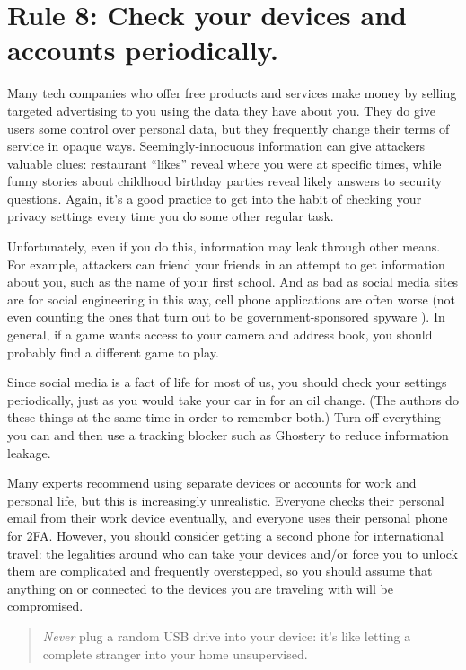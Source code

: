 \documentclass[10pt,letterpaper]{article}
\begin{document}
\section*{Rule 8: Check your devices and accounts periodically.}

Many tech companies who offer free products and services make money by selling
targeted advertising to you using the data they have about you.  They do give
users some control over personal data, but they frequently change their terms of
service in opaque ways. Seemingly-innocuous information can give attackers
valuable clues: restaurant ``likes'' reveal where you were at specific times,
while funny stories about childhood birthday parties reveal likely answers to
security questions. Again, it's a good practice to get into the habit of
checking your privacy settings every time you do some other regular task.

Unfortunately, even if you do this, information may leak through other
means. For example, attackers can friend your friends in an attempt to get
information about you, such as the name of your first school. And as bad as
social media sites are for social engineering in this way, cell phone
applications are often worse (not even counting the ones that turn out to be
government-sponsored spyware \cite{Schn2019}). In general, if a game wants
access to your camera and address book, you should probably find a different
game to play.

Since social media is a fact of life for most of us, you should check your
settings periodically, just as you would take your car in for an oil change.
(The authors do these things at the same time in order to remember both.)  Turn
off everything you can and then use a tracking blocker such as Ghostery to
reduce information leakage.

Many experts recommend using separate devices or accounts for work and personal
life, but this is increasingly unrealistic. Everyone checks their personal email
from their work device eventually, and everyone uses their personal phone for
2FA. However, you should consider getting a second phone for international
travel: the legalities around who can take your devices and/or force you to
unlock them are complicated and frequently overstepped, so you should assume
that anything on or connected to the devices you are traveling with will be
compromised.

\begin{quote}
  \emph{Never} plug a random USB drive into your device: it's like letting a
  complete stranger into your home unsupervised.
\end{quote}
\end{document}
